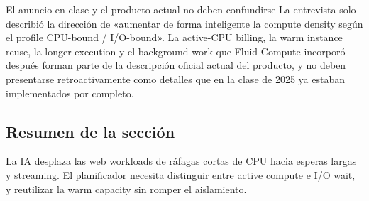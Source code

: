 \begin{warningbox}{El anuncio en clase y el producto actual no deben confundirse}
La entrevista solo describió la dirección de «aumentar de forma inteligente la compute density según el profile CPU-bound / I/O-bound». La active-CPU billing, la warm instance reuse, la longer execution y el background work que Fluid Compute incorporó después forman parte de la descripción oficial actual del producto, y no deben presentarse retroactivamente como detalles que en la clase de 2025 ya estaban implementados por completo.
\end{warningbox}


\subsection{Resumen de la sección}

La IA desplaza las web workloads de ráfagas cortas de CPU hacia esperas largas y streaming. El planificador necesita distinguir entre active compute e I/O wait, y reutilizar la warm capacity sin romper el aislamiento.
